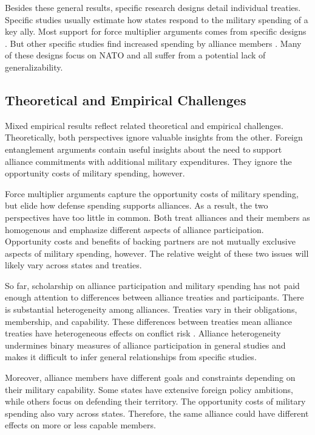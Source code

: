 \documentclass[12pt]{article}
\begin{document}
Besides these general results, specific research designs detail individual treaties. 
Specific studies usually estimate how states respond to the military spending of a key ally. 
Most support for force multiplier arguments comes from specific designs \citep{BarnettLevy1991, Morrow1993, Sorokin1994, PluemperNeumayer2015}. 
But other specific studies find increased spending by alliance members \citep{ConybeareSandler1990, Chenetal1996}. 
Many of these designs focus on NATO and all suffer from a potential lack of generalizability. 


\subsection{Theoretical and Empirical Challenges}


Mixed empirical results reflect related theoretical and empirical challenges. 
Theoretically, both perspectives ignore valuable insights from the other.  
Foreign entanglement arguments contain useful insights about the need to support alliance commitments with additional military expenditures.
They ignore the opportunity costs of military spending, however. 


Force multiplier arguments capture the opportunity costs of military spending, but elide how defense spending supports alliances. 
As a result, the two perspectives have too little in common. 
Both treat alliances and their members as homogenous and emphasize different aspects of alliance participation. 
Opportunity costs and benefits of backing partners are not mutually exclusive aspects of military spending, however. 
The relative weight of these two issues will likely vary across states and treaties. 


So far, scholarship on alliance participation and military spending has not paid enough attention to differences between alliance treaties and participants.
There is substantial heterogeneity among alliances.
Treaties vary in their obligations, membership, and capability. 
These differences between treaties mean alliance treaties have heterogeneous effects on conflict risk \citep{Leeds2003, Benson2012}. 
Alliance heterogeneity undermines binary measures of alliance participation in general studies and makes it difficult to infer general relationships from specific studies. 
 

Moreover, alliance members have different goals and constraints depending on their military capability.
Some states have extensive foreign policy ambitions, while others focus on defending their territory. 
The opportunity costs of military spending also vary across states. 
Therefore, the same alliance could have different effects on more or less capable members. 
\end{document}
